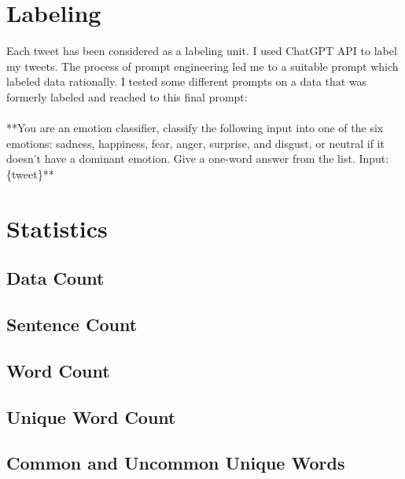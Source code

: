 \documentclass[rnd]{extarticle}
\begin{document}
	
	\section{Labeling}
		Each tweet has been considered as a labeling unit. I used ChatGPT API to label my tweets. The process of prompt engineering led me to a suitable prompt which labeled data rationally. I tested some different prompts on a data that was formerly labeled and reached to this final prompt:\\ \\
		**You are an emotion classifier, classify the following input into one of the six emotions: sadness, happiness, fear, anger, surprise, and disgust, or neutral if it doesn't have a dominant emotion. Give a one-word answer from the list. Input: \{tweet\}**
		
	\section{Statistics}
		
		\subsection{Data Count}
			

		
		\subsection{Sentence Count}
		


		\subsection{Word Count}
		

	
		\subsection{Unique Word Count}
	
		
		
		\subsection{Common and Uncommon Unique Words}
		\begin{center}
		\end{center}
	
\end{document}
